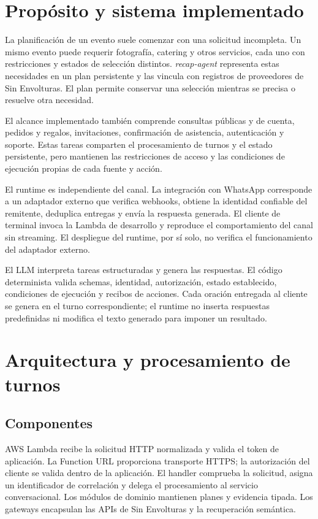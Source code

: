 \documentclass[
	a4paper,
	12pt,
]{CSSullivanBusinessReport}
\begin{document}
\section{Propósito y sistema implementado}
La planificación de un evento suele comenzar con una solicitud incompleta. Un mismo evento puede requerir fotografía, catering y otros servicios, cada uno con restricciones y estados de selección distintos. \textit{recap-agent} representa estas necesidades en un plan persistente y las vincula con registros de proveedores de Sin Envolturas. El plan permite conservar una selección mientras se precisa o resuelve otra necesidad.

El alcance implementado también comprende consultas públicas y de cuenta, pedidos y regalos, invitaciones, confirmación de asistencia, autenticación y soporte. Estas tareas comparten el procesamiento de turnos y el estado persistente, pero mantienen las restricciones de acceso y las condiciones de ejecución propias de cada fuente y acción.

El runtime es independiente del canal. La integración con WhatsApp corresponde a un adaptador externo que verifica webhooks, obtiene la identidad confiable del remitente, deduplica entregas y envía la respuesta generada. El cliente de terminal invoca la Lambda de desarrollo y reproduce el comportamiento del canal sin streaming. El despliegue del runtime, por sí solo, no verifica el funcionamiento del adaptador externo.

El LLM interpreta tareas estructuradas y genera las respuestas. El código determinista valida schemas, identidad, autorización, estado establecido, condiciones de ejecución y recibos de acciones. Cada oración entregada al cliente se genera en el turno correspondiente; el runtime no inserta respuestas predefinidas ni modifica el texto generado para imponer un resultado.

\section{Arquitectura y procesamiento de turnos}
\subsection{Componentes}
AWS Lambda recibe la solicitud HTTP normalizada y valida el token de aplicación. La Function URL proporciona transporte HTTPS; la autorización del cliente se valida dentro de la aplicación. El handler comprueba la solicitud, asigna un identificador de correlación y delega el procesamiento al servicio conversacional. Los módulos de dominio mantienen planes y evidencia tipada. Los gateways encapsulan las APIs de Sin Envolturas y la recuperación semántica.
\end{document}
